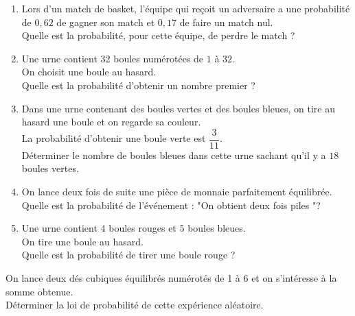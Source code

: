 {\begin{Exercice}
\leavevmode\vspace{-\baselineskip}
\begin{enumerate}[itemsep=1em]
	\item \begin{minipage}[t]{\linewidth}Lors d'un match de basket, l'équipe qui reçoit un adversaire a une probabilité de $0{,}62$ de gagner son match et $0{,}17$ de faire un match nul.\\Quelle est la probabilité, pour cette équipe, de perdre le match ?\end{minipage}
	\item \begin{minipage}[t]{\linewidth}Une urne contient $32$  boules numérotées de $1$ à $32$. \\
        On choisit une boule au hasard. \\
        Quelle est la probabilité d'obtenir  un nombre premier ? \end{minipage}
	\item \begin{minipage}[t]{\linewidth}Dans une urne contenant des boules vertes et des boules bleues, on tire au hasard
          une boule et on regarde sa couleur. \\
          La probabilité d'obtenir une boule verte est $\dfrac{3}{11}$.\\
          Déterminer le nombre de boules bleues dans cette urne sachant qu'il y a $18$
          boules vertes.\end{minipage}
	\item \begin{minipage}[t]{\linewidth}On lance deux fois de suite une pièce de monnaie parfaitement équilibrée.\\Quelle est la probabilité  de l'événement : "On obtient deux fois piles "?\end{minipage}
	\item \begin{minipage}[t]{\linewidth}Une urne contient $4$ boules rouges et $5$ boules bleues. \\
                On tire une boule au hasard. \\
              Quelle est la probabilité de tirer une boule rouge ? \end{minipage}
\end{enumerate}
\end{Exercice}

\begin{Exercice}
On lance deux dés cubiques équilibrés numérotés de 1 à 6 et on s'intéresse à la somme obtenue.\\
Déterminer la loi de probabilité de cette expérience aléatoire.
\end{Exercice}

}
